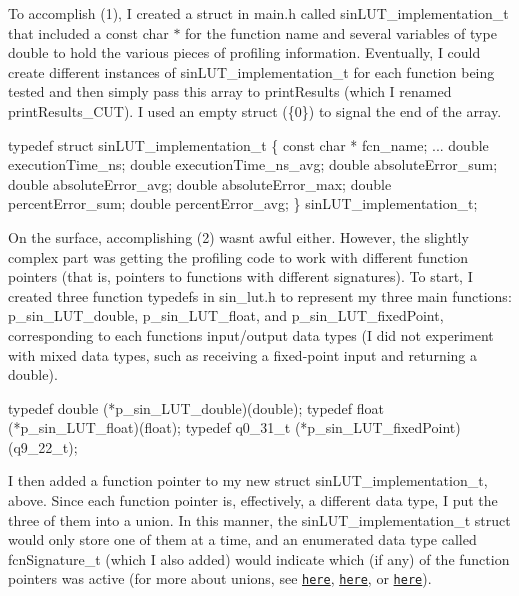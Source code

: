 To accomplish (1), I created a struct in {\ttfamily main.\+h} called {\ttfamily sin\+L\+U\+T\+\_\+implementation\+\_\+t} that included a {\ttfamily const char $\ast$} for the function name and several variables of type {\ttfamily double} to hold the various pieces of profiling information. Eventually, I could create different instances of {\ttfamily sin\+L\+U\+T\+\_\+implementation\+\_\+t} for each function being tested and then simply pass this array to {\ttfamily print\+Results} (which I renamed {\ttfamily print\+Results\+\_\+\+C\+UT}). I used an empty struct ({\ttfamily \{0\}}) to signal the end of the array. 
\begin{DoxyCode}
typedef struct sinLUT\_implementation\_t
\{
    const char * fcn\_name;
    ...
    double executionTime\_ns;
    double executionTime\_ns\_avg;
    double absoluteError\_sum;
    double absoluteError\_avg;
    double absoluteError\_max;
    double percentError\_sum;
    double percentError\_avg;
\} sinLUT\_implementation\_t;
\end{DoxyCode}
 On the surface, accomplishing (2) wasn\textquotesingle{}t awful either. However, the slightly complex part was getting the profiling code to work with different function pointers (that is, pointers to functions with different signatures). To start, I created three function typedefs in {\ttfamily sin\+\_\+lut.\+h} to represent my three main functions\+: {\ttfamily p\+\_\+sin\+\_\+\+L\+U\+T\+\_\+double}, {\ttfamily p\+\_\+sin\+\_\+\+L\+U\+T\+\_\+float}, and {\ttfamily p\+\_\+sin\+\_\+\+L\+U\+T\+\_\+fixed\+Point}, corresponding to each function\textquotesingle{}s input/output data types (I did not experiment with mixed data types, such as receiving a fixed-\/point input and returning a double). 
\begin{DoxyCode}
typedef double (*p\_sin\_LUT\_double)(double);
typedef float (*p\_sin\_LUT\_float)(float);
typedef q0\_31\_t (*p\_sin\_LUT\_fixedPoint)(q9\_22\_t);
\end{DoxyCode}
 I then added a function pointer to my new struct {\ttfamily sin\+L\+U\+T\+\_\+implementation\+\_\+t}, above. Since each function pointer is, effectively, a different data type, I put the three of them into a {\ttfamily union}. In this manner, the {\ttfamily sin\+L\+U\+T\+\_\+implementation\+\_\+t} struct would only store one of them at a time, and an enumerated data type called {\ttfamily fcn\+Signature\+\_\+t} (which I also added) would indicate which (if any) of the function pointers was active (for more about unions, see \href{https://www.tutorialspoint.com/cprogramming/c_unions.htm}{\tt here}, \href{https://www.geeksforgeeks.org/union-c/}{\tt here}, or \href{https://github.com/nathancharlesjones/Flexible-message-format}{\tt here}). 
